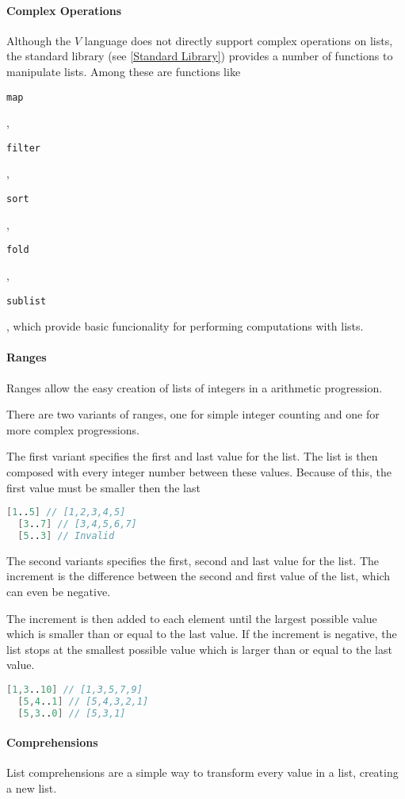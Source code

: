 \documentclass{article}
\def\code#1{\begin{footnotesize}\texttt{#1}\end{footnotesize}}
\begin{document}
\paragraph{Complex Operations}
Although the $V$ language does not directly support complex operations on lists, the standard library (see \ref{Standard Library}) provides a number of functions to manipulate lists.
Among these are functions like \code{map}, \code{filter}, \code{sort}, \code{fold}, \code{sublist}, which provide basic funcionality for performing computations with lists.

\paragraph{Ranges}
Ranges allow the easy creation of lists of integers in a arithmetic progression.

There are two variants of ranges, one for simple integer counting and one for more complex progressions.

The first variant specifies the first and last value for the list.
The list is then composed with every integer number between these values.
Because of this, the first value must be smaller then the last

\begin{lstlisting}[language=V]
  [1..5] // [1,2,3,4,5]
  [3..7] // [3,4,5,6,7]
  [5..3] // Invalid
\end{lstlisting}

The second variants specifies the first, second and last value for the list.
The increment is the difference between the second and first value of the list, which can even be negative.

The increment is then added to each element until the largest possible value which is smaller than or equal to the last value.
If the increment is negative, the list stops at the smallest possible value which is larger than or equal to the last value.

\begin{lstlisting}[language=V]
  [1,3..10] // [1,3,5,7,9]
  [5,4..1] // [5,4,3,2,1]
  [5,3..0] // [5,3,1]
\end{lstlisting}

\paragraph{Comprehensions}
List comprehensions are a simple way to transform every value in a list, creating a new list.
\end{document}
